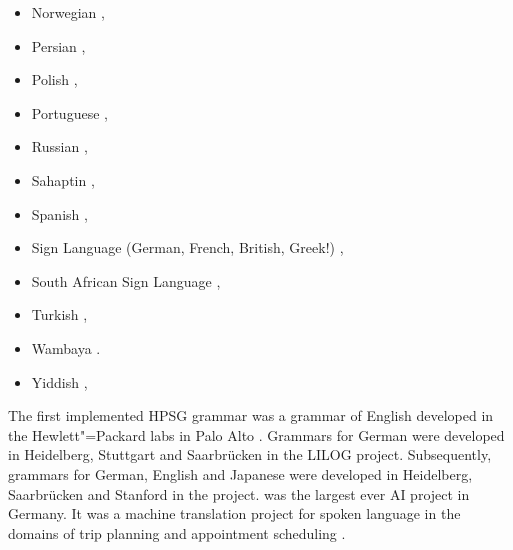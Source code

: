\begin{itemize}
\citep*{Liu97a,%
Ng97a,%
ML2009a,ML2013a,YF2014a-u,FSB2015a-u,FanSongBond2015a-u},
\item Norwegian \citep{HH2004a-u,BH2004a-u,HB2006a-u,Haugereid2017a-u}, 
\item Persian \citep{MuellerPersian,MG2010a},
\item Polish \citep*{PKMM2002a-u,MMPK2003a-u}, %
\item Portuguese \citep{BC2008a-u,BC2008b-u,CB2010a-u},
\item Russian \citep{AZ2009a-u}, %
\item Sahaptin \citep{Drellishak2009a-u}, %
\item Spanish
  \citep*{PinedaMeza2005-u,PinedaMeza2005b-u,Bildhauer2008a,Marimon2013a-u%
}, 
\item Sign Language (German, French, British, Greek!) \citep{SM2002a-u,MS2004a-u,SG2010a-u},
\item South African Sign Language \citep{Bungeroth2002a-u},
\item Turkish \citep*{Sehitoglu1996a-u,Gungordu1997a-u,FPB09a-u},
\item Wambaya \citep{Bender2008b-u,Bender2008a,Bender2010a-u}.
\item Yiddish \citep{MOe2011a},
\end{itemize}
The first implemented HPSG grammar was a grammar of English developed in the Hewlett"=Packard labs in Palo Alto
\citep*{FPW85a,Flickinger87}. Grammars for German were developed in Heidelberg, Stuttgart and
Saarbrücken in the LILOG project. Subsequently, grammars for German, English and Japanese were
developed in Heidelberg, Saarbrücken and Stanford in the \verbmobil project. \verbmobil was the
largest ever AI project in Germany. It was a machine translation project for spoken language in the
domains of trip planning and appointment scheduling \citep{Wahlster2000a-ed}.

